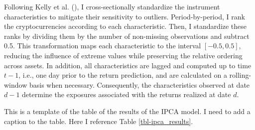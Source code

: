 \documentclass[
  12pt,
  a4paper,
  openany]{scrbook}
\begin{document}
Following Kelly et al.
(), I cross-sectionally
standardize the instrument characteristics to mitigate their sensitivity
to outliers. Period-by-period, I rank the cryptocurrencies according to
each characteristic. Then, I standardize these ranks by dividing them by
the number of non-missing observations and subtract 0.5. This
transformation maps each characteristic to the interval \([-0.5, 0.5]\),
reducing the influence of extreme values while preserving the relative
ordering across assets. In addition, all characteristics are lagged and
computed up to time \(t-1\), i.e., one day prior to the return
prediction, and are calculated on a rolling-window basis when necessary.
Consequently, the characteristics observed at date \(d-1\) determine the
exposures associated with the returns realized at date \(d\).

This is a template of the table of the results of the IPCA model. I need
to add a caption to the table. Here I reference Table
\ref{tbl-ipca_results}.
\end{document}
